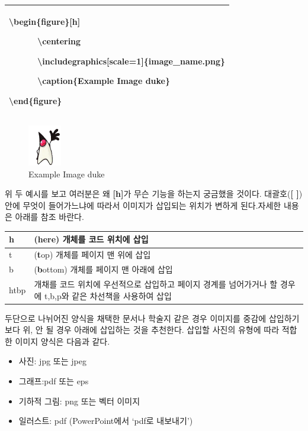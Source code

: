 \documentclass[12pt]{article}
\begin{document}
	\begin{tabularx}{\textwidth \onehalfspacing}{|X|}
		\hline
		\textbackslash begin\{figure\}[h]
		
		\ \ \ \ \ \ \textbackslash centering
		
		\ \ \ \ \ \ \textbackslash includegraphics[scale=1]\{image\_name.png\}
		
		\ \ \ \ \ \ \textbackslash caption\{Example Image duke\}
		
		\textbackslash end\{figure\}\\
		\hline
	\end{tabularx}
	\begin{figure}[h]
		\centering
		\includegraphics[scale=1]{T6.png}
		\caption{Example Image duke}
	\end{figure}
	\clearpage 위 두 예시를 보고 여러분은 왜 \textbf{[h]}가 무슨 기능을 하는지 궁금했을 것이다. 대괄호(\textbf{[ ]})안에 무엇이 들어가느냐에 따라서 이미지가 삽입되는 위치가 변하게 된다.자세한 내용은 아래를 참조 바란다.\newline
	
	\begin{tabularx}{\textwidth \onehalfspacing}{|l|X|}
		\hline
		h&(\textbf{h}ere) 개체를 코드 위치에 삽입\\
		\hline
		t&(\textbf{t}op) 개체를 페이지 맨 위에 삽입\\
		\hline
		b&(\textbf{b}ottom) 개체를 페이지 맨 아래에 삽입\\
		\hline
		htbp& 개채를 코드 위치에 우선적으로 삽입하고 페이지 경계를 넘어가거나 할 경우에 t,b,p와 같은 차선책을 사용하여 삽입\\
		\hline
	\end{tabularx}
	\newline\newline
	두단으로 나뉘어진 양식을 채택한 문서나 학술지 같은 경우 이미지를 중감에 삽입하기 보다 위, 안 될 경우 아래에 삽입하는 것을 추천한다.
	\newline\newline
	삽입할 사진의 유형에 따라 적합한 이미지 양식은 다음과 같다.
	\begin{itemize}
		\item 사진: jpg 또는 jpeg
		\item 그래프:pdf 또는 eps
		\item 기하적 그림: png 또는 벡터 이미지
		\item 일러스트: pdf (PowerPoint에서 `pdf로 내보내기')
	\end{itemize}
	\clearpage
\end{document}
